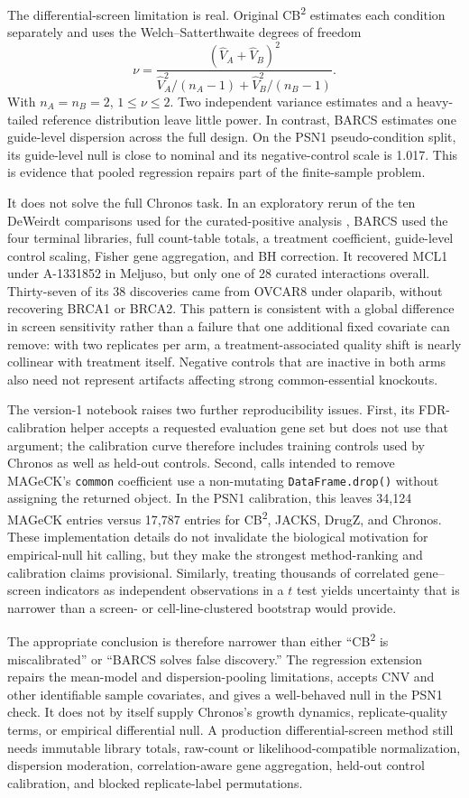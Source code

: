 The differential-screen limitation is real.  Original
CB\textsuperscript{2} estimates each condition separately and uses the
Welch--Satterthwaite degrees of freedom
\[
\nu=
\frac{(\widehat V_A+\widehat V_B)^2}
{\widehat V_A^2/(n_A-1)+\widehat V_B^2/(n_B-1)}.
\]
With $n_A=n_B=2$, $1\leq\nu\leq2$.  Two independent variance estimates and a
heavy-tailed reference distribution leave little power.  In contrast,
BARCS estimates one guide-level dispersion across the full
design.  On the PSN1 pseudo-condition split, its guide-level null is close to
nominal and its negative-control scale is 1.017.  This is evidence that pooled
regression repairs part of the finite-sample problem.

It does not solve the full Chronos task.  In an exploratory rerun of the ten
DeWeirdt comparisons used for the curated-positive analysis
\citep{deweirdt2020isogenic}, BARCS used the four terminal
libraries, full count-table totals, a treatment coefficient, guide-level
control scaling, Fisher gene aggregation, and BH correction.  It recovered
MCL1 under A-1331852 in Meljuso, but only one of 28 curated interactions
overall.  Thirty-seven of its 38 discoveries came from OVCAR8 under olaparib,
without recovering BRCA1 or BRCA2.  This pattern is consistent with a global
difference in screen sensitivity rather than a failure that one additional
fixed covariate can remove: with two replicates per arm, a treatment-associated
quality shift is nearly collinear with treatment itself.  Negative controls
that are inactive in both arms also need not represent artifacts affecting
strong common-essential knockouts.

The version-1 notebook raises two further reproducibility issues.  First, its
FDR-calibration helper accepts a requested evaluation gene set but does not
use that argument; the calibration curve therefore includes training controls
used by Chronos as well as held-out controls.  Second, calls intended to remove
MAGeCK's \texttt{common} coefficient use a non-mutating
\texttt{DataFrame.drop()} without assigning the returned object.  In the PSN1
calibration, this leaves 34,124 MAGeCK entries versus 17,787 entries for
CB\textsuperscript{2}, JACKS, DrugZ, and Chronos.  These implementation details
do not invalidate the biological motivation for empirical-null hit calling,
but they make the strongest method-ranking and calibration claims provisional.
Similarly, treating thousands of correlated gene--screen indicators as
independent observations in a $t$ test yields uncertainty that is narrower
than a screen- or cell-line-clustered bootstrap would provide.

The appropriate conclusion is therefore narrower than either ``CB\textsuperscript{2}
is miscalibrated'' or ``BARCS solves false discovery.''
The regression extension repairs the mean-model and dispersion-pooling
limitations, accepts CNV and other identifiable sample covariates, and gives a
well-behaved null in the PSN1 check.  It does not by itself supply Chronos's
growth dynamics, replicate-quality terms, or empirical differential null.
A production differential-screen method still needs immutable library totals,
raw-count or likelihood-compatible normalization, dispersion moderation,
correlation-aware gene aggregation, held-out control calibration, and blocked
replicate-label permutations.

